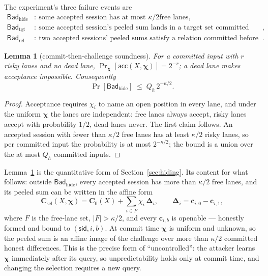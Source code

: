 \documentclass[11pt]{article}
\newcommand{\Bad}{\mathsf{Bad}}
\newtheorem{lemma}[theorem]{Lemma}
\begin{document}
The experiment's three failure events are
\begin{align*}
 \Bad_{\mathrm{hide}}&:\ \text{some accepted session has at most $\kappa/2$
   free lanes},\\
 \Bad_{\mathrm{tgt}}&:\ \text{some accepted session's peeled sum lands in a
   target set committed before its challenge query},\\
 \Bad_{\mathrm{rel}}&:\ \text{two accepted sessions' peeled sums satisfy a
   relation committed before the later session's challenge query}.
\end{align*}

\begin{lemma}[commit-then-challenge soundness]
\label{lem:sound}
For a committed input with $r$ risky lanes and no dead lane,
$\Pr_{\boldsymbol\chi}[\mathsf{acc}(X,\boldsymbol\chi)]=2^{-r}$; a dead lane
makes acceptance impossible.  Consequently
\[
 \Pr[\Bad_{\mathrm{hide}}]\;\le\;Q_h\,2^{-\kappa/2}.
\]
\end{lemma}

\begin{proof}
Acceptance requires $\chi_i$ to name an open position in every lane, and
under the uniform $\boldsymbol\chi$ the lanes are independent: free lanes
always accept, risky lanes accept with probability $1/2$, dead lanes never.
The first claim follows.  An accepted session with fewer than $\kappa/2$ free
lanes has at least $\kappa/2$ risky lanes, so per committed input the
probability is at most $2^{-\kappa/2}$; the bound is a union over the at most
$Q_h$ committed inputs.
\end{proof}

Lemma~\ref{lem:sound} is the quantitative form of
Section~\ref{sec:hiding}.  Its content for what follows: outside
$\Bad_{\mathrm{hide}}$, every accepted session has more than
$\kappa/2$ free lanes, and its peeled sum can be written in the affine form
\[
 \mathbf C_{\mathrm{sel}}(X,\boldsymbol\chi)
 =\mathbf C_0(X)+\sum_{i\in F}\chi_i\,\boldsymbol\Delta_i,
 \qquad
 \boldsymbol\Delta_i=\mathbf c_{i,0}-\mathbf c_{i,1},
\]
where $F$ is the free-lane set, $|F|>\kappa/2$, and every $\mathbf c_{i,b}$
is openable --- honestly formed and bound to $(\mathsf{sid},i,b)$.  At commit
time $\boldsymbol\chi$ is uniform and unknown, so the peeled sum is an
affine image of the challenge over more than $\kappa/2$ committed honest
differences.  This is the precise form of ``uncontrolled'': the attacker
learns $\boldsymbol\chi$ immediately after its query, so unpredictability
holds only at commit time, and changing the selection requires a new query.
\end{document}
